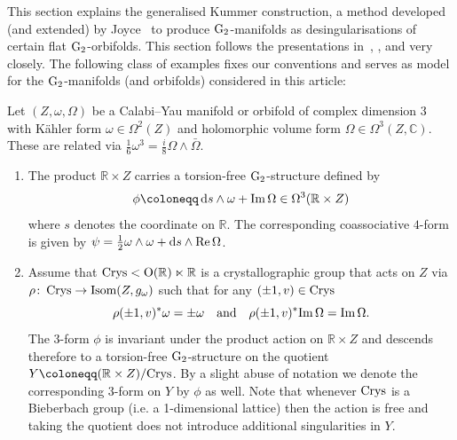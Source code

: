 \documentclass[11pt,a4paper]{scrartcl}
\newcommand*\diff{\mathop{}\!\textup{d}}
\newcommand{\col}{\colon \thinspace}
\newcommand{\im}{\textup{Im}\thinspace }
\newcommand{\re}{\textup{Re}\thinspace }
\newcommand{\G}{\textup{G}}
\renewcommand{\O}{\textup{O}}
\numberwithin{equation}{section}
\theoremstyle{plain}
\theoremstyle{definition}
\theoremstyle{remark}
\begin{document}
This section explains the generalised Kummer construction, a method developed (and extended) by Joyce~\cite{Joyce-GeneralisedKummer1,Joyce-GeneralisedKummer2,Joyce-Black} to produce $\G_2$-manifolds as desingularisations of certain flat $\G_2$-orbifolds. This section follows the presentations in~\cite[Section~2]{DPSDTW-Associatives}, \cite[Section~2.1]{Gutwein-coassociatives}, and \cite[Chapter~2]{Gutwein-Diss} very closely. The following class of examples fixes our conventions and serves as model for the $\G_2$-manifolds (and orbifolds) considered in this article:
\begin{example}\label{ex_G2Model}
Let $(Z,\omega,\Omega)$ be a Calabi--Yau manifold or orbifold of complex dimension 3 with Kähler form $\omega \in \Omega^2(Z)$ and holomorphic volume form $\Omega \in \Omega^3(Z,\mathbb{C})$. These are related via $\frac{1}{6}\omega^3 = \frac{i}{8}\Omega\wedge\bar{\Omega}$. 
\begin{enumerate}
\item The product $\mathbb{R} \times Z$ carries a torsion-free $\G_2$-structure defined by
\begin{equation}\label{eq:modelG2Structure}
\phi \coloneqq \diff s \wedge \omega + \im \Omega \in \Omega^3(\mathbb{R} \times Z)
\end{equation}
where $s$ denotes the coordinate on $\mathbb{R}$. The corresponding coassociative $4$-form is given by $\psi = \frac{1}{2}\omega	\wedge \omega + \diff s \wedge \re \Omega$.
\item Assume that $\textup{Crys}< \O(\mathbb{R}) \ltimes  \mathbb{R}$ is a crystallographic group that acts on $Z$ via $\rho \col \textup{Crys} \to \textup{Isom}(Z,g_\omega)$ such that for any $(\pm 1,v) \in \textup{Crys}$
\begin{equation}\label{eq:CalabiYauEquivariance}
\rho(\pm 1,v)^* \omega = \pm \omega \quad \textup{and} \quad \rho(\pm 1,v)^*\im\Omega =\im \Omega. 
\end{equation}
The $3$-form $\phi$ is invariant under the product action on $\mathbb{R} \times Z$ and descends therefore to a torsion-free $\G_2$-structure on the quotient $Y\coloneqq (\mathbb{R} \times Z)/\textup{Crys}$. By a slight abuse of notation we denote the corresponding $3$-form on $Y$ by $\phi$ as well. Note that whenever $\textup{Crys}$ is a Bieberbach group (i.e. a 1-dimensional lattice) then the action is free and taking the quotient does not introduce additional singularities in $Y$.
\end{enumerate}  
\end{example}
\end{document}
